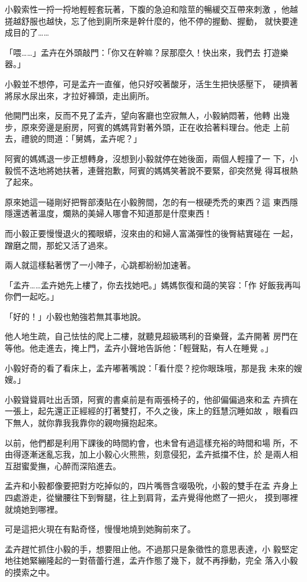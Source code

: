 小毅索性一捋一捋地輕輕套玩著，下腹的急迫和陰莖的暢緩交互帶來刺激
，他越搓越舒服也越快，忘了他到廁所來是幹什麼的，他不停的握動、握動，
就快要達成目的了……

「喂……」孟卉在外頭敲門：「你又在幹嘛？尿那麼久！快出來，我們去
打遊樂器。」

小毅並不想停，可是孟卉一直催，他只好咬著酸牙，活生生把快感壓下，
硬擠著將尿水尿出來，才拉好褲頭，走出廁所。

他開門出來，反而不見了孟卉，望向客廳也空寂無人，小毅納悶著，他轉
出幾步，原來旁邊是廚房，阿賓的媽媽背對著外頭，正在收拾著料理台。他走
上前去，禮貌的問道：「舅媽，孟卉呢？」

阿賓的媽媽退一步正想轉身，沒想到小毅就停在她後面，兩個人輕撞了一
下，小毅慌不迭地將她扶著，連聲抱歉，阿賓的媽媽笑著說不要緊，卻突然覺
得耳根熱了起來。

原來她這一碰剛好把臀部湊貼在小毅胯間，怎的有一根硬禿禿的東西？這
東西隱隱還透著溫度，爛熟的美婦人哪會不知道那是什麼東西！

而小毅正要慢慢退火的獨眼蟒，沒來由的和婦人富滿彈性的後臀結實碰在
一起，蹭磨之間，那蛇又活了過來。

兩人就這樣黏著愣了一小陣子，心跳都紛紛加速著。

「孟卉……孟卉她先上樓了，你去找她吧。」媽媽恢復和藹的笑容：「作
好飯我再叫你們一起吃。」

「好的！」小毅也勉強若無其事地說。

他人地生疏，自己怯怯的爬上二樓，就聽見超級瑪利的音樂聲，孟卉開著
房門在等他。他走進去，掩上門，孟卉小聲地告訴他：「輕聲點，有人在睡覺
。」

小毅好奇的看了看床上，孟卉嘟著嘴說：「看什麼？挖你眼珠哦，那是我
未來的嫂嫂。」

小毅聳聳肩吐出舌頭，阿賓的書桌前是有兩張椅子的，他卻偏偏過來和孟
卉擠在一張上，起先還正正經經的打著雙打，不久之後，床上的鈺慧沉睡如故
，眼看四下無人，就你靠我我靠你的親吻擁抱起來。

以前，他們都是利用下課後的時間約會，也未曾有過這樣充裕的時間和場
所，不由得逐漸迷亂忘我，加上小毅心火熊熊，刻意侵犯，孟卉抵擋不住，於
是兩人相互甜蜜愛撫，心醉而深陷進去。

孟卉和小毅都像要把對方吃掉似的，四片嘴唇含啜吸吮，小毅的雙手在孟
卉身上四處游走，從蠻腰往下到臀腿，往上到肩背，孟卉覺得他燃了一把火，
摸到哪裡就燒她到哪裡。

可是這把火現在有點奇怪，慢慢地燒到她胸前來了。

孟卉趕忙抓住小毅的手，想要阻止他。不過那只是象徵性的意思表達，小
毅堅定地往她緊繃隆起的一對蓓蕾行進，孟卉作態了幾下，就不再掙動，完全
落入小毅的摸索之中。

